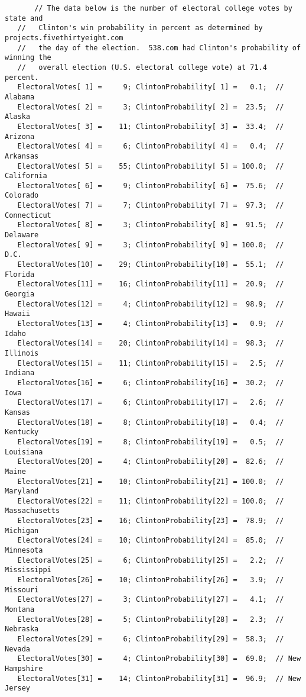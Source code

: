 \documentclass{report}
\begin{document}
\begin{lstlisting}
       // The data below is the number of electoral college votes by state and
   //   Clinton's win probability in percent as determined by projects.fivethirtyeight.com
   //   the day of the election.  538.com had Clinton's probability of winning the
   //   overall election (U.S. electoral college vote) at 71.4 percent.
   ElectoralVotes[ 1] =     9; ClintonProbability[ 1] =   0.1;  // Alabama
   ElectoralVotes[ 2] =     3; ClintonProbability[ 2] =  23.5;  // Alaska
   ElectoralVotes[ 3] =    11; ClintonProbability[ 3] =  33.4;  // Arizona
   ElectoralVotes[ 4] =     6; ClintonProbability[ 4] =   0.4;  // Arkansas
   ElectoralVotes[ 5] =    55; ClintonProbability[ 5] = 100.0;  // California
   ElectoralVotes[ 6] =     9; ClintonProbability[ 6] =  75.6;  // Colorado
   ElectoralVotes[ 7] =     7; ClintonProbability[ 7] =  97.3;  // Connecticut
   ElectoralVotes[ 8] =     3; ClintonProbability[ 8] =  91.5;  // Delaware
   ElectoralVotes[ 9] =     3; ClintonProbability[ 9] = 100.0;  // D.C.
   ElectoralVotes[10] =    29; ClintonProbability[10] =  55.1;  // Florida
   ElectoralVotes[11] =    16; ClintonProbability[11] =  20.9;  // Georgia
   ElectoralVotes[12] =     4; ClintonProbability[12] =  98.9;  // Hawaii
   ElectoralVotes[13] =     4; ClintonProbability[13] =   0.9;  // Idaho
   ElectoralVotes[14] =    20; ClintonProbability[14] =  98.3;  // Illinois
   ElectoralVotes[15] =    11; ClintonProbability[15] =   2.5;  // Indiana
   ElectoralVotes[16] =     6; ClintonProbability[16] =  30.2;  // Iowa
   ElectoralVotes[17] =     6; ClintonProbability[17] =   2.6;  // Kansas
   ElectoralVotes[18] =     8; ClintonProbability[18] =   0.4;  // Kentucky
   ElectoralVotes[19] =     8; ClintonProbability[19] =   0.5;  // Louisiana
   ElectoralVotes[20] =     4; ClintonProbability[20] =  82.6;  // Maine
   ElectoralVotes[21] =    10; ClintonProbability[21] = 100.0;  // Maryland
   ElectoralVotes[22] =    11; ClintonProbability[22] = 100.0;  // Massachusetts
   ElectoralVotes[23] =    16; ClintonProbability[23] =  78.9;  // Michigan
   ElectoralVotes[24] =    10; ClintonProbability[24] =  85.0;  // Minnesota
   ElectoralVotes[25] =     6; ClintonProbability[25] =   2.2;  // Mississippi
   ElectoralVotes[26] =    10; ClintonProbability[26] =   3.9;  // Missouri
   ElectoralVotes[27] =     3; ClintonProbability[27] =   4.1;  // Montana
   ElectoralVotes[28] =     5; ClintonProbability[28] =   2.3;  // Nebraska
   ElectoralVotes[29] =     6; ClintonProbability[29] =  58.3;  // Nevada
   ElectoralVotes[30] =     4; ClintonProbability[30] =  69.8;  // New Hampshire
   ElectoralVotes[31] =    14; ClintonProbability[31] =  96.9;  // New Jersey

\end{lstlisting}
\end{document}

